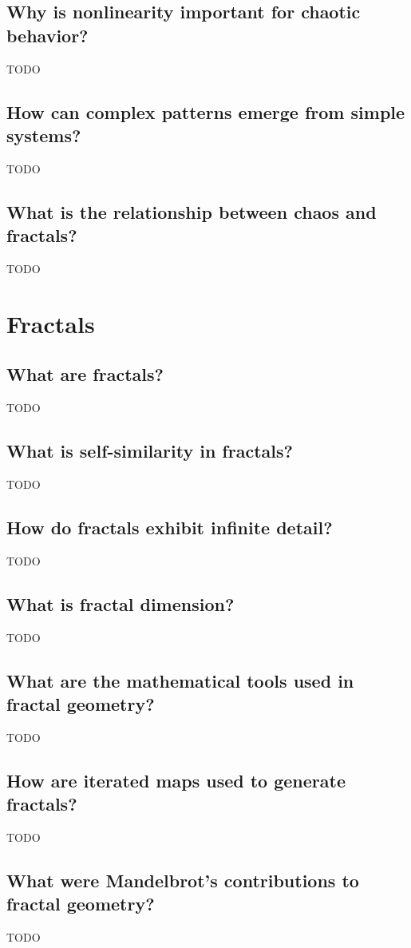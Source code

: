 \documentclass[12pt]{article}
\begin{document}
\subsection{Why is nonlinearity important for chaotic behavior?}
TODO

\subsection{How can complex patterns emerge from simple systems?}
TODO

\subsection{What is the relationship between chaos and fractals?}
TODO

\section{Fractals}
\subsection{What are fractals?}
TODO

\subsection{What is self-similarity in fractals?}
TODO

\subsection{How do fractals exhibit infinite detail?}
TODO

\subsection{What is fractal dimension?}
TODO

\subsection{What are the mathematical tools used in fractal geometry?}
TODO

\subsection{How are iterated maps used to generate fractals?}
TODO

\subsection{What were Mandelbrot's contributions to fractal geometry?}
TODO
\end{document}
